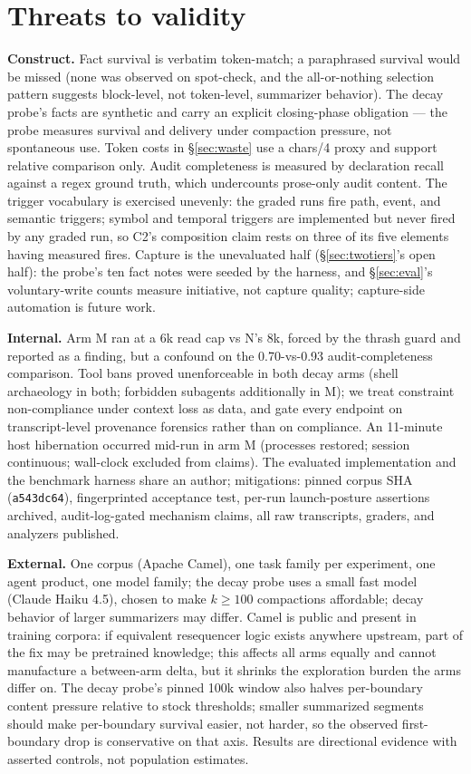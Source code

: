 \documentclass[11pt]{article}
\begin{document}
\section{Threats to validity}
\label{sec:threats}

\textbf{Construct.} Fact survival is verbatim token-match; a paraphrased
survival would be missed (none was observed on spot-check, and the
all-or-nothing selection pattern suggests block-level, not token-level,
summarizer behavior). The decay probe's facts are synthetic and carry
an explicit closing-phase obligation --- the probe measures survival and
delivery under compaction pressure, not spontaneous use. Token costs
in \S\ref{sec:waste} use a chars/4 proxy and support relative comparison only.
Audit completeness is measured by declaration recall against a regex
ground truth, which undercounts prose-only audit content. The trigger
vocabulary is exercised unevenly: the graded runs fire path, event,
and semantic triggers; symbol and temporal triggers are implemented
but never fired by any graded run, so C2's composition claim rests on
three of its five elements having measured fires. Capture is the
unevaluated half (\S\ref{sec:twotiers}'s open half): the probe's ten fact notes were
seeded by the harness, and \S\ref{sec:eval}'s voluntary-write counts measure initiative,
not capture quality; capture-side automation is future work.

\textbf{Internal.} Arm M ran at a 6k read cap vs N's 8k, forced by the
thrash guard and reported as a finding, but a confound on the
0.70-vs-0.93 audit-completeness comparison. Tool bans proved
unenforceable in both decay arms (shell archaeology in both; forbidden
subagents additionally in M); we treat constraint non-compliance under
context loss as data, and
gate every endpoint on transcript-level provenance forensics rather
than on compliance. An 11-minute host hibernation occurred mid-run in
arm M (processes restored; session continuous; wall-clock excluded
from claims). The evaluated implementation and the benchmark harness
share an author; mitigations: pinned corpus SHA (\texttt{a543dc64}),
fingerprinted acceptance test, per-run launch-posture assertions
archived, audit-log-gated mechanism claims, all raw transcripts,
graders, and analyzers published.

\textbf{External.} One corpus (Apache Camel), one task family per
experiment, one agent product, one model family; the decay probe uses
a small fast model (Claude Haiku 4.5), chosen to make $k \ge 100$
compactions affordable; decay behavior of larger summarizers may
differ. Camel is public and present in training corpora: if
equivalent resequencer logic exists anywhere upstream, part of the
fix may be pretrained knowledge; this affects all arms equally and
cannot manufacture a between-arm delta, but it shrinks the
exploration burden the arms differ on. The decay probe's pinned 100k
window also halves per-boundary content pressure relative to stock
thresholds; smaller summarized segments should make per-boundary
survival easier, not harder, so the observed first-boundary drop is
conservative on that axis. Results are directional evidence with
asserted controls, not population estimates.
\end{document}
